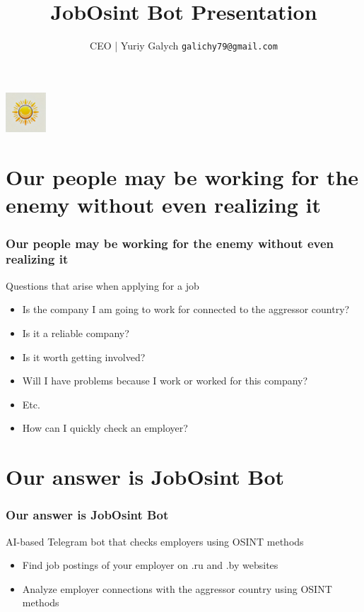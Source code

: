 \documentclass[aspectratio=169]{beamer}
\title{JobOsint Bot Presentation}
\author{CEO | Yuriy Galych \newline \texttt{galichy79@gmail.com}}
\date{} %
\begin{document}
\begin{frame}
    \centering
    \includegraphics[height=1.5cm]{logo.png} %
    \vspace{1cm}
    \titlepage
\end{frame}

\section{Our people may be working for the enemy without even realizing it}

\begin{frame}
    \frametitle{Our people may be working for the enemy without even realizing it}
    
    \begin{block}{Questions that arise when applying for a job}
        \begin{itemize}
            \item Is the company I am going to work for connected to the aggressor country?
            \item Is it a reliable company?
            \item Is it worth getting involved?
            \item Will I have problems because I work or worked for this company?
            \item Etc.
            \item How can I quickly check an employer?
        \end{itemize}
    \end{block}
    
\end{frame}

\section{Our answer is JobOsint Bot}

\begin{frame}
    \frametitle{Our answer is JobOsint Bot}
    
    \begin{block}{AI-based Telegram bot that checks employers using OSINT methods}
        \begin{itemize}
            \item Find job postings of your employer on .ru and .by websites
            \item Analyze employer connections with the aggressor country using OSINT methods
        \end{itemize}
    \end{block}
    
\end{frame}
\end{document}
